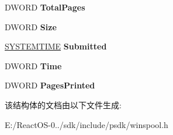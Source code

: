 \begin{DoxyCompactItemize}
D\+W\+O\+RD {\bfseries Total\+Pages}
\item 
\mbox{\label{struct___j_o_b___i_n_f_o__2_a_adf32862a22dfada4fd8048b5431fa1aa}} 
D\+W\+O\+RD {\bfseries Size}
\item 
\mbox{\label{struct___j_o_b___i_n_f_o__2_a_a5486135265c14f0c7879bc9ab9770592}} 
\hyperlink{struct___s_y_s_t_e_m_t_i_m_e}{S\+Y\+S\+T\+E\+M\+T\+I\+ME} {\bfseries Submitted}
\item 
\mbox{\label{struct___j_o_b___i_n_f_o__2_a_ad58d1a5e2679b57a072f0c215d9ecff9}} 
D\+W\+O\+RD {\bfseries Time}
\item 
\mbox{\label{struct___j_o_b___i_n_f_o__2_a_a37cad190602563fc04755e148951ad87}} 
D\+W\+O\+RD {\bfseries Pages\+Printed}
\end{DoxyCompactItemize}


该结构体的文档由以下文件生成\+:\begin{DoxyCompactItemize}
\item 
E\+:/\+React\+O\+S-\/0../sdk/include/psdk/winspool.\+h\end{DoxyCompactItemize}
